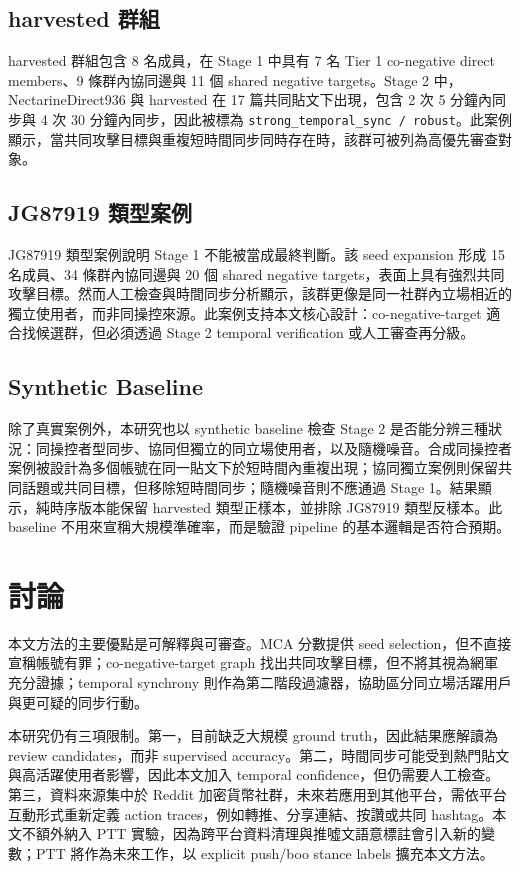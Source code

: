 \documentclass[conference]{IEEEtran}
\begin{document}
\subsection{harvested 群組}

harvested 群組包含 8 名成員，在 Stage 1 中具有 7 名 Tier 1 co-negative direct members、9 條群內協同邊與 11 個 shared negative targets。Stage 2 中，NectarineDirect936 與 harvested 在 17 篇共同貼文下出現，包含 2 次 5 分鐘內同步與 4 次 30 分鐘內同步，因此被標為 \texttt{strong\_temporal\_sync / robust}。此案例顯示，當共同攻擊目標與重複短時間同步同時存在時，該群可被列為高優先審查對象。

\subsection{JG87919 類型案例}

JG87919 類型案例說明 Stage 1 不能被當成最終判斷。該 seed expansion 形成 15 名成員、34 條群內協同邊與 20 個 shared negative targets，表面上具有強烈共同攻擊目標。然而人工檢查與時間同步分析顯示，該群更像是同一社群內立場相近的獨立使用者，而非同操控來源。此案例支持本文核心設計：co-negative-target 適合找候選群，但必須透過 Stage 2 temporal verification 或人工審查再分級。

\subsection{Synthetic Baseline}

除了真實案例外，本研究也以 synthetic baseline 檢查 Stage 2 是否能分辨三種狀況：同操控者型同步、協同但獨立的同立場使用者，以及隨機噪音。合成同操控者案例被設計為多個帳號在同一貼文下於短時間內重複出現；協同獨立案例則保留共同話題或共同目標，但移除短時間同步；隨機噪音則不應通過 Stage 1。結果顯示，純時序版本能保留 harvested 類型正樣本，並排除 JG87919 類型反樣本。此 baseline 不用來宣稱大規模準確率，而是驗證 pipeline 的基本邏輯是否符合預期。

\section{討論}

本文方法的主要優點是可解釋與可審查。MCA 分數提供 seed selection，但不直接宣稱帳號有罪；co-negative-target graph 找出共同攻擊目標，但不將其視為網軍充分證據；temporal synchrony 則作為第二階段過濾器，協助區分同立場活躍用戶與更可疑的同步行動。

本研究仍有三項限制。第一，目前缺乏大規模 ground truth，因此結果應解讀為 review candidates，而非 supervised accuracy。第二，時間同步可能受到熱門貼文與高活躍使用者影響，因此本文加入 temporal confidence，但仍需要人工檢查。第三，資料來源集中於 Reddit 加密貨幣社群，未來若應用到其他平台，需依平台互動形式重新定義 action traces，例如轉推、分享連結、按讚或共同 hashtag。本文不額外納入 PTT 實驗，因為跨平台資料清理與推噓文語意標註會引入新的變數；PTT 將作為未來工作，以 explicit push/boo stance labels 擴充本文方法。
\end{document}
